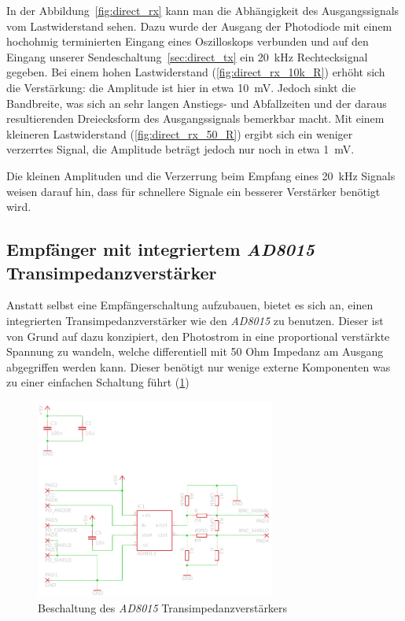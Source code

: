 \documentclass[12pt,a4paper]{article}
\begin{document}
In der Abbildung~\ref{fig:direct_rx} kann man die Abhängigkeit des Ausgangssignals vom Lastwiderstand sehen. Dazu wurde der Ausgang der Photodiode mit einem hochohmig terminierten Eingang eines Oszilloskops verbunden und auf den Eingang unserer Sendeschaltung~\ref{sec:direct_tx} ein \SI{20}{\kilo\hertz} Rechtecksignal gegeben. Bei einem hohen Lastwiderstand (\ref{fig:direct_rx_10k_R}) erhöht sich die Verstärkung: die Amplitude ist hier in etwa \SI{10}{\milli\volt}. Jedoch sinkt die Bandbreite, was sich an sehr langen Anstiegs- und Abfallzeiten und der daraus resultierenden Dreiecksform des Ausgangssignals bemerkbar macht. Mit einem kleineren Lastwiderstand (\ref{fig:direct_rx_50_R}) ergibt sich ein weniger verzerrtes Signal, die Amplitude beträgt jedoch nur noch in etwa \SI{1}{\milli\volt}.

Die kleinen Amplituden und die Verzerrung beim Empfang eines \SI{20}{\kilo\hertz} Signals weisen darauf hin, dass für schnellere Signale ein besserer Verstärker benötigt wird.

\subsection{Empfänger mit integriertem \textit{AD8015} Transimpedanzverstärker}
Anstatt selbst eine Empfängerschaltung aufzubauen, bietet es sich an, einen integrierten Transimpedanzverstärker wie den \textit{AD8015} zu benutzen. Dieser ist von Grund auf dazu konzipiert, den Photostrom in eine proportional verstärkte Spannung zu wandeln, welche differentiell mit 50 Ohm Impedanz am Ausgang abgegriffen werden kann. Dieser benötigt nur wenige externe Komponenten was zu einer einfachen Schaltung führt (\ref{fig:receiver_sch})


\begin{figure}[H]
  \centering
    \includegraphics[width=0.7\textwidth]{img/receiver.pdf}
  \caption{Beschaltung des \textit{AD8015} Transimpedanzverstärkers}
  \label{fig:receiver_sch}
\end{figure}
\end{document}
